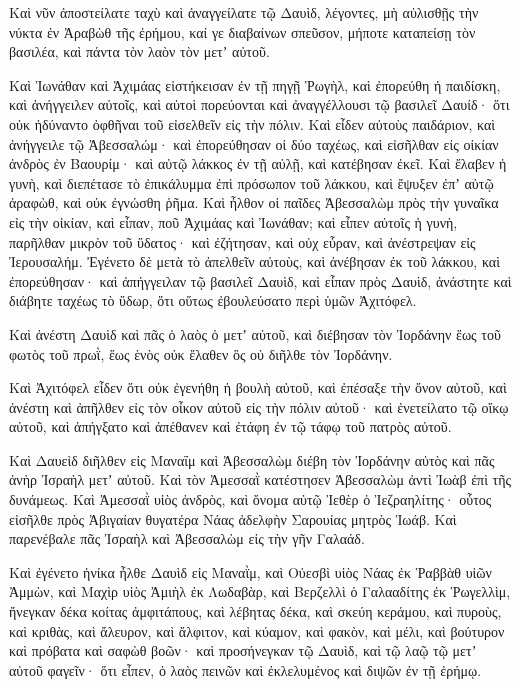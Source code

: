 {Καὶ νῦν ἀποστείλατε ταχὺ καὶ ἀναγγείλατε τῷ Δαυὶδ, λέγοντες, μὴ αὐλισθῇς τὴν νύκτα ἐν Ἀραβὼθ τῆς ἐρήμου, καί γε διαβαίνων σπεῦσον, μήποτε καταπείσῃ τὸν βασιλέα, καὶ πάντα τὸν λαὸν τὸν μετʼ αὐτοῦ.
\par }{\PP {}Καὶ Ἰωνάθαν καὶ Ἀχιμάας εἱστήκεισαν ἐν τῇ πηγῇ Ῥωγὴλ, καὶ ἐπορεύθη ἡ παιδίσκη, καὶ ἀνήγγειλεν αὐτοῖς, καὶ αὐτοὶ πορεύονται καὶ ἀναγγέλλουσι τῷ βασιλεῖ Δαυίδ· ὅτι οὐκ ἠδύναντο ὀφθῆναι τοῦ εἰσελθεῖν εἰς τὴν πόλιν.
Καὶ εἶδεν αὐτοὺς παιδάριον, καὶ ἀνήγγειλε τῷ Ἀβεσσαλώμ· καὶ ἐπορεύθησαν οἱ δύο ταχέως, καὶ εἰσῆλθαν εἰς οἰκίαν ἀνδρὸς ἐν Βαουρίμ· καὶ αὐτῷ λάκκος ἐν τῇ αὐλῇ, καὶ κατέβησαν ἐκεῖ.
Καὶ ἔλαβεν ἡ γυνὴ, καὶ διεπέτασε τὸ ἐπικάλυμμα ἐπὶ πρόσωπον τοῦ λάκκου, καὶ ἔψυξεν ἐπʼ αὐτῷ ἀραφὼθ, καὶ οὐκ ἐγνώσθη ῥῆμα.
Καὶ ἦλθον οἱ παῖδες Ἀβεσσαλὼμ πρὸς τὴν γυναῖκα εἰς τὴν οἰκίαν, καὶ εἶπαν, ποῦ Ἀχιμάας καὶ Ἰωνάθαν; καὶ εἶπεν αὐτοῖς ἡ γυνὴ, παρῆλθαν μικρὸν τοῦ ὕδατος· καὶ ἐζήτησαν, καὶ οὐχ εὗραν, καὶ ἀνέστρεψαν εἰς Ἰερουσαλήμ.
Ἐγένετο δὲ μετὰ τὸ ἀπελθεῖν αὐτοὺς, καὶ ἀνέβησαν ἐκ τοῦ λάκκου, καὶ ἐπορεύθησαν· καὶ ἀπήγγειλαν τῷ βασιλεῖ Δαυὶδ, καὶ εἶπαν πρὸς Δαυὶδ, ἀνάστητε καὶ διάβητε ταχέως τὸ ὕδωρ, ὅτι οὕτως ἐβουλεύσατο περὶ ὑμῶν Ἀχιτόφελ.
\par }{\PP {}Καὶ ἀνέστη Δαυὶδ καὶ πᾶς ὁ λαὸς ὁ μετʼ αὐτοῦ, καὶ διέβησαν τὸν Ἰορδάνην ἕως τοῦ φωτὸς τοῦ πρωῒ, ἕως ἑνὸς οὐκ ἔλαθεν ὃς οὐ διῆλθε τὸν Ἰορδάνην.
\par }{\PP {}Καὶ Ἀχιτόφελ εἶδεν ὅτι οὐκ ἐγενήθη ἡ βουλὴ αὐτοῦ, καὶ ἐπέσαξε τὴν ὄνον αὐτοῦ, καὶ ἀνέστη καὶ ἀπῆλθεν εἰς τὸν οἶκον αὐτοῦ εἰς τὴν πόλιν αὐτοῦ· καὶ ἐνετείλατο τῷ οἴκῳ αὐτοῦ, καὶ ἀπήγξατο καὶ ἀπέθανεν καὶ ἐτάφη ἐν τῷ τάφῳ τοῦ πατρὸς αὐτοῦ.
\par }{\PP {}Καὶ Δαυεὶδ διῆλθεν εἰς Μαναΐμ καὶ Ἀβεσσαλὼμ διέβη τὸν Ἰορδάνην αὐτὸς καὶ πᾶς ἀνὴρ Ἰσραὴλ μετʼ αὐτοῦ.
Καὶ τὸν Ἀμεσσαῒ κατέστησεν Ἀβεσσαλὼμ ἀντὶ Ἰωὰβ ἐπὶ τῆς δυνάμεως. Καὶ Ἀμεσσαῒ υἱὸς ἀνδρὸς, καὶ ὄνομα αὐτῷ Ἰεθὲρ ὁ Ἰεζραηλίτης· οὗτος εἰσῆλθε πρὸς Ἀβιγαίαν θυγατέρα Νάας ἀδελφὴν Σαρουίας μητρὸς Ἰωάβ.
Καὶ παρενέβαλε πᾶς Ἰσραὴλ καὶ Ἀβεσσαλὼμ εἰς τὴν γῆν Γαλαάδ.
\par }{\PP {}Καὶ ἐγένετο ἡνίκα ἦλθε Δαυὶδ εἰς Μαναῒμ, καὶ Οὐεσβὶ υἱὸς Νάας ἐκ Ῥαββὰθ υἱῶν Ἀμμὼν, καὶ Μαχὶρ υἱὸς Ἀμιὴλ ἐκ Λωδαβὰρ, καὶ Βερζελλὶ ὁ Γαλααδίτης ἐκ Ῥωγελλὶμ,
ἤνεγκαν δέκα κοίτας ἀμφιτάπους, καὶ λέβητας δέκα, καὶ σκεύη κεράμου, καὶ πυροὺς, καὶ κριθὰς, καὶ ἄλευρον, καὶ ἄλφιτον, καὶ κύαμον, καὶ φακὸν,
καὶ μέλι, καὶ βούτυρον καὶ πρόβατα καὶ σαφὼθ βοῶν· καὶ προσήνεγκαν τῷ Δαυὶδ, καὶ τῷ λαῷ τῷ μετʼ αὐτοῦ φαγεῖν· ὅτι εἶπεν, ὁ λαὸς πεινῶν καὶ ἐκλελυμένος καὶ διψῶν ἐν τῇ ἐρήμῳ.

}
